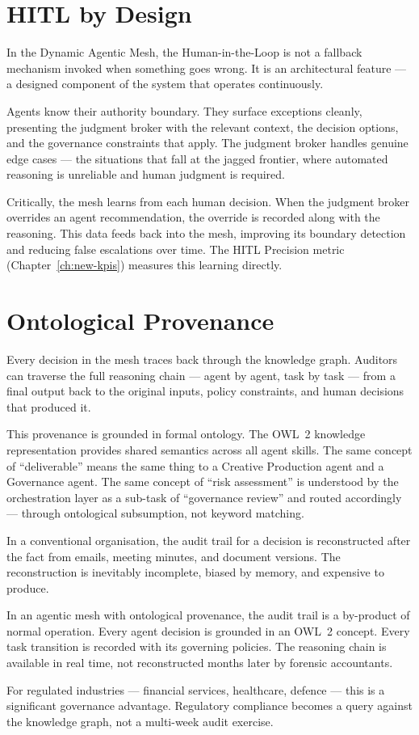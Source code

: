 \section{HITL by Design}

In the Dynamic Agentic Mesh, the Human-in-the-Loop is not a fallback mechanism invoked when something goes wrong. It is an architectural feature --- a designed component of the system that operates continuously.

Agents know their authority boundary. They surface exceptions cleanly, presenting the judgment broker with the relevant context, the decision options, and the governance constraints that apply. The judgment broker handles genuine edge cases --- the situations that fall at the jagged frontier, where automated reasoning is unreliable and human judgment is required.

Critically, the mesh learns from each human decision. When the judgment broker overrides an agent recommendation, the override is recorded along with the reasoning. This data feeds back into the mesh, improving its boundary detection and reducing false escalations over time. The HITL Precision metric (Chapter~\ref{ch:new-kpis}) measures this learning directly.

\section{Ontological Provenance}

Every decision in the mesh traces back through the knowledge graph. Auditors can traverse the full reasoning chain --- agent by agent, task by task --- from a final output back to the original inputs, policy constraints, and human decisions that produced it.

This provenance is grounded in formal ontology. The OWL~2 knowledge representation provides shared semantics across all agent skills. The same concept of ``deliverable'' means the same thing to a Creative Production agent and a Governance agent. The same concept of ``risk assessment'' is understood by the orchestration layer as a sub-task of ``governance review'' and routed accordingly --- through ontological subsumption, not keyword matching.

\begin{evidencebox}[title={Why Ontological Provenance Matters}]
In a conventional organisation, the audit trail for a decision is reconstructed after the fact from emails, meeting minutes, and document versions. The reconstruction is inevitably incomplete, biased by memory, and expensive to produce.

In an agentic mesh with ontological provenance, the audit trail is a by-product of normal operation. Every agent decision is grounded in an OWL~2 concept. Every task transition is recorded with its governing policies. The reasoning chain is available in real time, not reconstructed months later by forensic accountants.

For regulated industries --- financial services, healthcare, defence --- this is a significant governance advantage. Regulatory compliance becomes a query against the knowledge graph, not a multi-week audit exercise.
\end{evidencebox}

